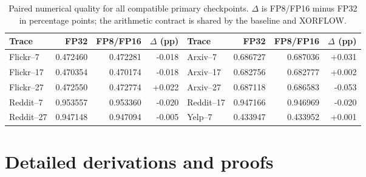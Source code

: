 \documentclass[10pt,conference]{IEEEtran}
\newcommand{\sys}{\textsc{XORFLOW}}
\begin{document}
\begin{table}[t]
\centering
\caption{Paired numerical quality for all compatible primary checkpoints. $\Delta$ is FP8/FP16 minus FP32 in percentage points; the arithmetic contract is shared by the baseline and \sys{}.}
\label{tab:s-quality}
\scriptsize
\setlength{\tabcolsep}{5pt}
\begin{tabular}{lrrr@{\hspace{12pt}}lrrr}
\toprule
Trace & FP32 & FP8/FP16 & $\Delta$ (pp) & Trace & FP32 & FP8/FP16 & $\Delta$ (pp) \\
\midrule
Flickr--7  & 0.472460 & 0.472281 & -0.018 & Arxiv--7  & 0.686727 & 0.687036 & +0.031 \\
Flickr--17 & 0.470354 & 0.470174 & -0.018 & Arxiv--17 & 0.682756 & 0.682777 & +0.002 \\
Flickr--27 & 0.472550 & 0.472774 & +0.022 & Arxiv--27 & 0.687118 & 0.686583 & -0.053 \\
Reddit--7  & 0.953557 & 0.953360 & -0.020 & Reddit--17 & 0.947166 & 0.946969 & -0.020 \\
Reddit--27 & 0.947148 & 0.947094 & -0.005 & Yelp--7 & 0.433947 & 0.433952 & +0.001 \\
\bottomrule
\end{tabular}
\end{table}

\section{Detailed derivations and proofs}
\end{document}
